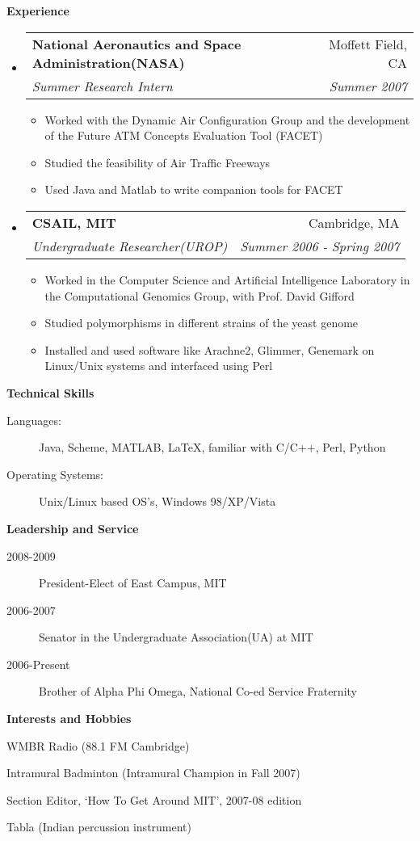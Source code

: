 \documentclass[letterpaper,10pt]{article}
\makeatletter
\newcommand{\resitem}[1]{\item #1 \vspace{-2pt}}
\newcommand{\resheading}[1]{{\large \colorbox{mygrey}{\begin{minipage}{\textwidth}{\textbf{#1 \vphantom{p\^{E}}}}\end{minipage}}}}
\newcommand{\ressubheading}[4]{
\begin{tabular*}{6.5in}{l@{\extracolsep{\fill}}r}
		\textbf{#1} & #2 \\
		\textit{#3} & \textit{#4} \\
\end{tabular*}\vspace{-6pt}}
\makeatother
\begin{document}
\resheading{Experience}
\begin{itemize}
\item
	\ressubheading{National Aeronautics and Space Administration(NASA)}{Moffett Field, CA}{Summer Research Intern}{Summer 2007}
	\begin{itemize}
		\resitem{Worked with the Dynamic Air Configuration Group and the development of the Future ATM Concepts Evaluation Tool (FACET)}
		\resitem{Studied the feasibility of Air Traffic Freeways}
		\resitem{Used Java and Matlab to write companion tools for FACET}
	\end{itemize}
\item
	\ressubheading{CSAIL, MIT}{Cambridge, MA}{Undergraduate Researcher(UROP)}{Summer 2006 - Spring 2007}
	\begin{itemize}
		\resitem{Worked in the Computer Science and Artificial Intelligence Laboratory in the Computational Genomics Group, with Prof. David Gifford}
		\resitem{Studied polymorphisms in different strains of the yeast genome}
		\resitem{Installed and used software like Arachne2, Glimmer, Genemark on Linux/Unix systems and interfaced using Perl}
	\end{itemize}
\end{itemize}

\resheading{Technical Skills}

\begin{description}
\item[Languages:]
Java, Scheme, MATLAB, \LaTeX, familiar with C/C++, Perl, Python
\item[Operating Systems:]
Unix/Linux based OS's, Windows 98/XP/Vista
\end{description}

\resheading{Leadership and Service}
\begin{description}
\item[2008-2009] President-Elect of East Campus, MIT
\item[2006-2007] Senator in the Undergraduate Association(UA) at MIT
\item[2006-Present] Brother of Alpha Phi Omega, National Co-ed Service Fraternity
\end{description}

\resheading{Interests and Hobbies}
\begin{description}
\item WMBR Radio (88.1 FM Cambridge)
\item Intramural Badminton (Intramural Champion in Fall 2007)
\item Section Editor, `How To Get Around MIT', 2007-08 edition
\item Tabla (Indian percussion instrument)
\end{description}
\end{document}
